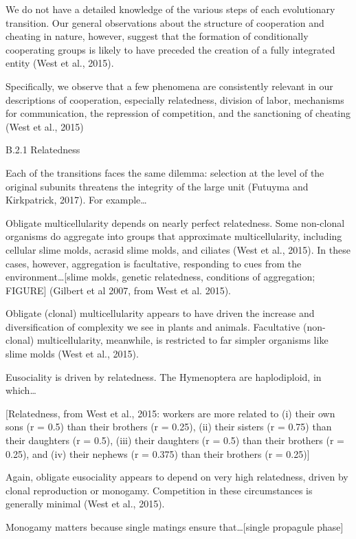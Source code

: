 \documentclass{tufte-book} %
\begin{document}
We do not have a detailed knowledge of the various steps of each evolutionary transition. Our general observations about the structure of cooperation and cheating in nature, however, suggest that the formation of conditionally cooperating groups is likely to have preceded the creation of a fully integrated entity (West et al., 2015). 


Specifically, we observe that a few phenomena are consistently relevant in our descriptions of cooperation, especially relatedness, division of labor, mechanisms for communication, the repression of competition, and the sanctioning of cheating  (West et al., 2015)

B.2.1 Relatedness


Each of the transitions faces the same dilemma: selection at the level of the original subunits threatens the integrity of the large unit (Futuyma and Kirkpatrick, 2017). For example…

Obligate multicellularity depends on nearly perfect relatedness. Some non-clonal organisms do aggregate into groups that approximate multicellularity, including cellular slime molds, acrasid slime molds, and ciliates (West et al., 2015). In these cases, however, aggregation is facultative, responding to cues from the environment…[slime molds, genetic relatedness, conditions of aggregation; FIGURE] (Gilbert et al 2007, from West et al. 2015).

Obligate (clonal) multicellularity appears to have driven the increase and diversification of complexity we see in plants and animals. Facultative (non-clonal) multicellularity, meanwhile, is restricted to far simpler organisms like slime molds (West et al., 2015). 

Eusociality is driven by relatedness. The Hymenoptera are haplodiploid, in which…

[Relatedness, from West et al., 2015: workers are more related to (i) their own sons (r = 0.5) than their brothers (r = 0.25), (ii) their sisters (r = 0.75) than their daughters (r = 0.5), (iii) their daughters (r = 0.5) than their brothers (r = 0.25), and (iv) their nephews (r = 0.375) than their brothers (r = 0.25)]

Again, obligate eusociality appears to depend on very high relatedness, driven by clonal reproduction or monogamy. Competition in these circumstances is generally minimal (West et al., 2015).

Monogamy matters because single matings ensure that…[single propagule phase]
\end{document}
